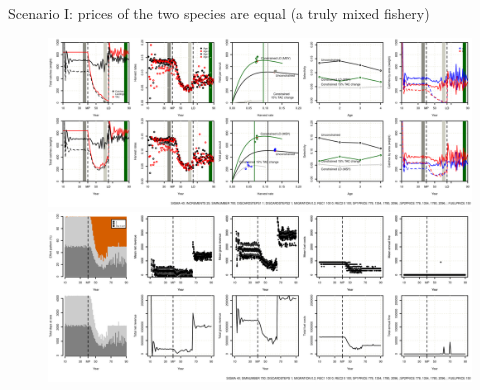 \documentclass[12pt,oneline,a4paper,numbib]{ouparticle}
\numberwithin{equation}{subsection} %
\begin{document}
\newpage
Scenario I: prices of the two species are equal (a truly mixed fishery)
\begin{figure}[!h]
\centering
\begin{minipage}{.45\textwidth}
\includegraphics[width=0.9\textheight, angle=90]{Figures/Catch_scenarioI.eps} 
\end{minipage}
\hfill
\begin{minipage}{.45\textwidth}
\includegraphics[width=0.9\textheight, angle=90]{Figures/Effort_scenarioI.eps} 
\end{minipage}
\caption{}
\end{figure}

\end{document}
